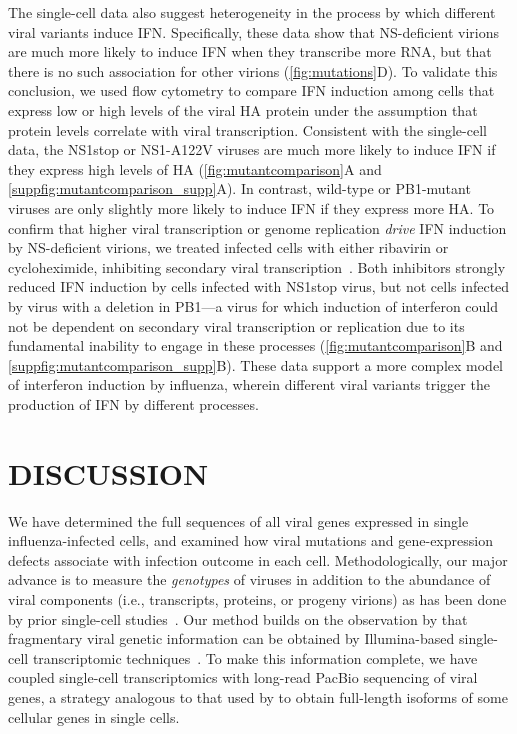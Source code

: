 \documentclass[10pt,letterpaper]{article}
\newcommand{\FIG}[1]{\autoref{fig:#1}}
\newcommand{\SUPPFIG}[1]{\autoref{suppfig:#1}}
\begin{document}
The single-cell data also suggest heterogeneity in the process by which different viral variants induce IFN.
Specifically, these data show that NS-deficient virions are much more likely to induce IFN when they transcribe more RNA, but that there is no such association for other virions (\FIG{mutations}D).
To validate this conclusion, we used flow cytometry to compare IFN induction among cells that express low or high levels of the viral HA protein under the assumption that protein levels correlate with viral transcription.
Consistent with the single-cell data, the NS1stop or NS1-A122V viruses are much more likely to induce IFN if they express high levels of HA (\FIG{mutantcomparison}A and \SUPPFIG{mutantcomparison_supp}A).
In contrast, wild-type or PB1-mutant viruses are only slightly more likely to induce IFN if they express more HA. 
To confirm that higher viral transcription or genome replication \emph{drive} IFN induction by NS-deficient virions, we treated infected cells with either ribavirin or cycloheximide, inhibiting secondary viral transcription~\citep{Vanderlinden:2016ec,reuther2015generation,Scholtissek:1976wg, killip2014activation}.
Both inhibitors strongly reduced IFN induction by cells infected with NS1stop virus, but not cells infected by virus with a deletion in PB1---a virus for which induction of interferon could not be dependent on secondary viral transcription or replication due to its fundamental inability to engage in these processes (\FIG{mutantcomparison}B and \SUPPFIG{mutantcomparison_supp}B).
These data support a more complex model of interferon induction by influenza, wherein different viral variants trigger the production of IFN by different processes.
 

\section*{DISCUSSION}
We have determined the full sequences of all viral genes expressed in single influenza-infected cells, and examined how viral mutations and gene-expression defects associate with infection outcome in each cell.
Methodologically, our major advance is to measure the \emph{genotypes} of viruses in addition to the abundance of viral components (i.e., transcripts, proteins, or progeny virions) as has been done by prior single-cell studies~\citep{russell2018extreme, zanini2018single, zanini2018virus, steuerman2018dissection, saikia2018simultaneous, oneal2018west, zhu2009growth, schulte2014single, akpinar2016high, heldt2015single, brooke2013most}.
Our method builds on the observation by that fragmentary viral genetic information can be obtained by Illumina-based single-cell transcriptomic techniques~\citep{saikia2018simultaneous, zanini2018virus}.
To make this information complete, we have coupled single-cell transcriptomics with long-read PacBio sequencing of viral genes, a strategy analogous to that used by \citep{gupta2018single} to obtain full-length isoforms of some cellular genes in single cells.
\end{document}
